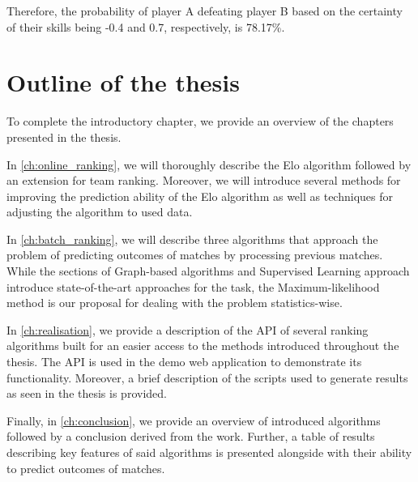 \begin{example}
Therefore, the probability of player A defeating player B based on the certainty of their skills being -0.4 and 0.7, respectively, is 78.17\%.
\end{example}

\section{Outline of the thesis}
To complete the introductory chapter, we provide an overview of the chapters presented in the thesis. 

In \autoref{ch:online_ranking}, we will thoroughly describe the Elo algorithm followed by an extension for team ranking. Moreover, we will introduce several methods for improving the prediction ability of the Elo algorithm as well as techniques for adjusting the algorithm to used data.

In \autoref{ch:batch_ranking}, we will describe three algorithms that approach the problem of predicting outcomes of matches by processing previous matches. While the sections of Graph-based algorithms and Supervised Learning approach introduce state-of-the-art approaches for the task, the Maximum-likelihood method is our proposal for dealing with the problem statistics-wise.

In \autoref{ch:realisation}, we provide a description of the API of several ranking algorithms built for an easier access to the methods introduced throughout the thesis. The API is used in the demo web application to demonstrate its functionality. Moreover, a brief description of the scripts used to generate results as seen in the thesis is provided.

Finally, in \autoref{ch:conclusion}, we provide an overview of introduced algorithms followed by a conclusion derived from the work. Further, a table of results describing key features of said algorithms is presented alongside with their ability to predict outcomes of matches.